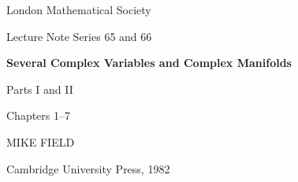 \begin{titlepage}
    \centering
    {\Large London Mathematical Society\par Lecture Note Series 65 and 66\par}
    \vfill
    {\Huge\bfseries Several Complex Variables and Complex Manifolds\par}
    \vspace{1cm}
    {\LARGE Parts I and II\par}
    \vspace{0.6cm}
    {\large Chapters 1--7\par}
    \vspace{2cm}
    {\LARGE MIKE FIELD\par}
    \vfill
    {\Large Cambridge University Press, 1982\par}
\end{titlepage}
